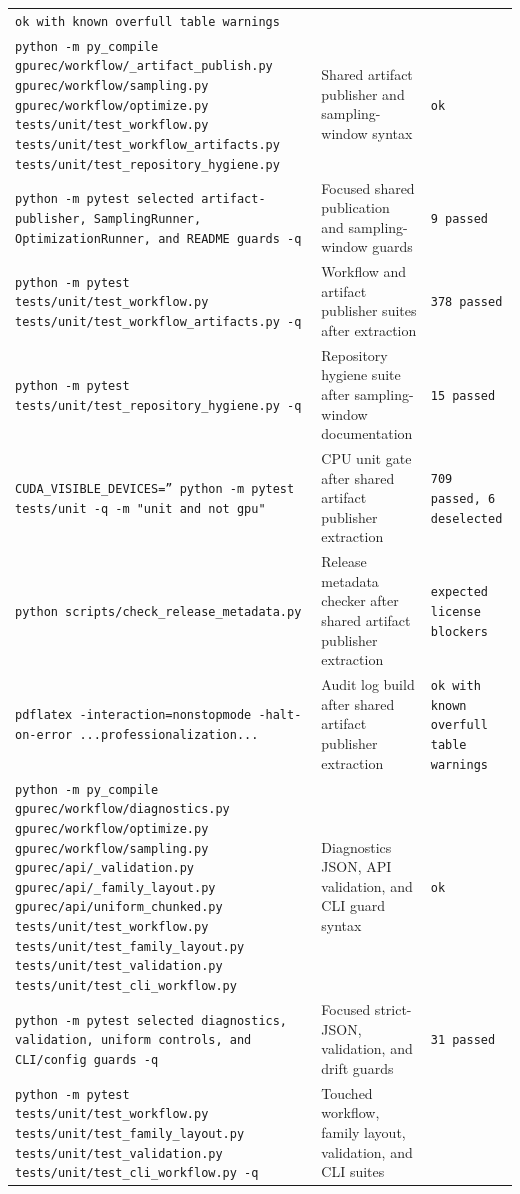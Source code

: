 \documentclass[11pt]{article}
\begin{document}
\begin{center}
\begin{tabular}{lll}
\texttt{ok with known overfull table warnings} \\
\texttt{python -m py\_compile gpurec/workflow/\_artifact\_publish.py gpurec/workflow/sampling.py gpurec/workflow/optimize.py tests/unit/test\_workflow.py tests/unit/test\_workflow\_artifacts.py tests/unit/test\_repository\_hygiene.py} &
Shared artifact publisher and sampling-window syntax &
\texttt{ok} \\
\texttt{python -m pytest selected artifact-publisher, SamplingRunner, OptimizationRunner, and README guards -q} &
Focused shared publication and sampling-window guards &
\texttt{9 passed} \\
\texttt{python -m pytest tests/unit/test\_workflow.py tests/unit/test\_workflow\_artifacts.py -q} &
Workflow and artifact publisher suites after extraction &
\texttt{378 passed} \\
\texttt{python -m pytest tests/unit/test\_repository\_hygiene.py -q} &
Repository hygiene suite after sampling-window documentation &
\texttt{15 passed} \\
\texttt{CUDA\_VISIBLE\_DEVICES='' python -m pytest tests/unit -q -m "unit and not gpu"} &
CPU unit gate after shared artifact publisher extraction &
\texttt{709 passed, 6 deselected} \\
\texttt{python scripts/check\_release\_metadata.py} &
Release metadata checker after shared artifact publisher extraction &
\texttt{expected license blockers} \\
\texttt{pdflatex -interaction=nonstopmode -halt-on-error ...professionalization...} &
Audit log build after shared artifact publisher extraction &
\texttt{ok with known overfull table warnings} \\
\texttt{python -m py\_compile gpurec/workflow/diagnostics.py gpurec/workflow/optimize.py gpurec/workflow/sampling.py gpurec/api/\_validation.py gpurec/api/\_family\_layout.py gpurec/api/uniform\_chunked.py tests/unit/test\_workflow.py tests/unit/test\_family\_layout.py tests/unit/test\_validation.py tests/unit/test\_cli\_workflow.py} &
Diagnostics JSON, API validation, and CLI guard syntax &
\texttt{ok} \\
\texttt{python -m pytest selected diagnostics, validation, uniform controls, and CLI/config guards -q} &
Focused strict-JSON, validation, and drift guards &
\texttt{31 passed} \\
\texttt{python -m pytest tests/unit/test\_workflow.py tests/unit/test\_family\_layout.py tests/unit/test\_validation.py tests/unit/test\_cli\_workflow.py -q} &
Touched workflow, family layout, validation, and CLI suites &

\end{tabular}
\end{center}
\end{document}
